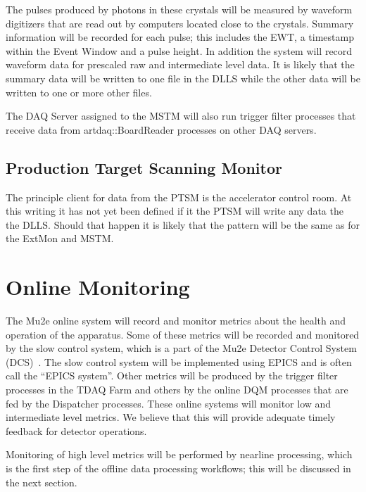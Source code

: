 The pulses produced by photons in these crystals will be measured by waveform digitizers that are read out
by computers located close to the crystals.
Summary information will be recorded for each pulse; this includes the EWT,
a timestamp within the Event Window and a pulse height.
In addition the system will record waveform data for prescaled raw and intermediate level data.
It is likely that the summary data will be written to one file in the DLLS
while the other data will be written to one or more other files.


\begin{sloppypar}
The DAQ Server assigned to the MSTM will also run trigger filter processes that receive
data from {\code artdaq::BoardReader} processes on other DAQ servers.
\end{sloppypar}


\subsection{Production Target Scanning Monitor}

The principle client for data from the PTSM is the accelerator control room.
At this writing it has not yet been defined if it the PTSM will write any data the the DLLS.
Should that happen it is likely that the pattern will be the same as for the ExtMon
and MSTM.

\section{Online Monitoring}
\label{sec:onlineMonitoring}

The Mu2e online system will record and monitor metrics about the health and operation of the apparatus.
Some of these metrics will be recorded and monitored by the slow control system,
which is a part	of the Mu2e Detector Control System (DCS)~\cite{DCSSpec}.
The slow control system will be implemented using EPICS and is often call the ``EPICS system''.
Other metrics will be produced by the trigger filter processes in the TDAQ Farm
and others by the online DQM processes that are fed by the Dispatcher processes.
These online systems will monitor low and intermediate level metrics.
We believe that this will provide adequate timely feedback for detector operations.

Monitoring of high level metrics will be performed by nearline processing,
which is the first step of the offline data processing workflows;
this will be discussed in the next section.

